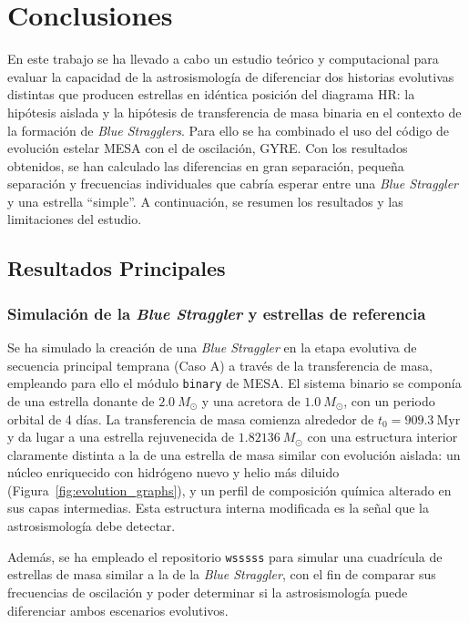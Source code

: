 \chapter{Conclusiones}

En este trabajo se ha llevado a cabo un estudio teórico y computacional para evaluar la capacidad de la astrosismología de diferenciar dos historias evolutivas distintas que producen estrellas en idéntica posición del diagrama HR: la hipótesis aislada y la hipótesis de transferencia de masa binaria en el contexto de la formación de \textit{Blue Stragglers}. Para ello se ha combinado el uso del código de evolución estelar MESA con el de oscilación, GYRE. Con los resultados obtenidos, se han calculado las diferencias en gran separación, pequeña separación y frecuencias individuales que cabría esperar entre una \textit{Blue Straggler} y una estrella ``simple''. A continuación, se resumen los resultados y las limitaciones del estudio.

\section{Resultados Principales}

\subsection{Simulación de la \textit{Blue Straggler} y estrellas de referencia}

Se ha simulado la creación de una \textit{Blue Straggler} en la etapa evolutiva de secuencia principal temprana (Caso A) a través de la transferencia de masa, empleando para ello el módulo \texttt{binary} de MESA. El sistema binario se componía de una estrella donante de $2.0~M_\odot$ y una acretora de $1.0~M_\odot$, con un periodo orbital de 4 días. La transferencia de masa comienza alrededor de $t_0 = 909.3~\mathrm{Myr}$ y da lugar a una estrella rejuvenecida de $1.82136~M_\odot$ con una estructura interior claramente distinta a la de una estrella de masa similar con evolución aislada: un núcleo enriquecido con hidrógeno nuevo y helio más diluido (Figura~\ref{fig:evolution_graphs}), y un perfil de composición química alterado en sus capas intermedias. Esta estructura interna modificada es la señal que la astrosismología debe detectar.

Además, se ha empleado el repositorio \texttt{wsssss} para simular una cuadrícula de estrellas de masa similar a la de la \textit{Blue Straggler}, con el fin de comparar sus frecuencias de oscilación y poder determinar si la astrosismología puede diferenciar ambos escenarios evolutivos.


